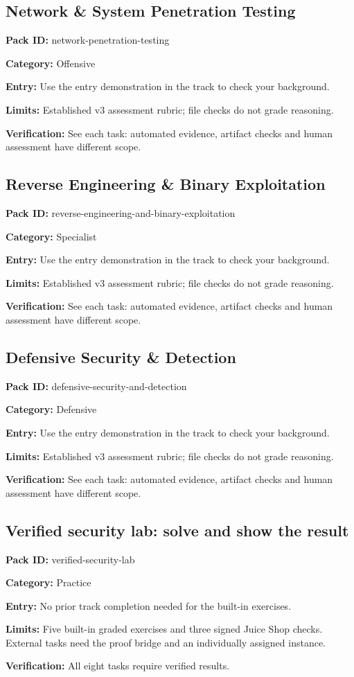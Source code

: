 \subsection{Network \& System Penetration Testing}
\noindent\textbf{Pack ID:} network-penetration-testing\par
\noindent\textbf{Category:} Offensive\par
\noindent\textbf{Entry:} Use the entry demonstration in the track to check your background.\par
\noindent\textbf{Limits:} Established v3 assessment rubric; file checks do not grade reasoning.\par
\noindent\textbf{Verification:} See each task: automated evidence, artifact checks and human assessment have different scope.\par
\subsection{Reverse Engineering \& Binary Exploitation}
\noindent\textbf{Pack ID:} reverse-engineering-and-binary-exploitation\par
\noindent\textbf{Category:} Specialist\par
\noindent\textbf{Entry:} Use the entry demonstration in the track to check your background.\par
\noindent\textbf{Limits:} Established v3 assessment rubric; file checks do not grade reasoning.\par
\noindent\textbf{Verification:} See each task: automated evidence, artifact checks and human assessment have different scope.\par
\subsection{Defensive Security \& Detection}
\noindent\textbf{Pack ID:} defensive-security-and-detection\par
\noindent\textbf{Category:} Defensive\par
\noindent\textbf{Entry:} Use the entry demonstration in the track to check your background.\par
\noindent\textbf{Limits:} Established v3 assessment rubric; file checks do not grade reasoning.\par
\noindent\textbf{Verification:} See each task: automated evidence, artifact checks and human assessment have different scope.\par
\subsection{Verified security lab: solve and show the result}
\noindent\textbf{Pack ID:} verified-security-lab\par
\noindent\textbf{Category:} Practice\par
\noindent\textbf{Entry:} No prior track completion needed for the built-in exercises.\par
\noindent\textbf{Limits:} Five built-in graded exercises and three signed Juice Shop checks. External tasks need the proof bridge and an individually assigned instance.\par
\noindent\textbf{Verification:} All eight tasks require verified results.\par
